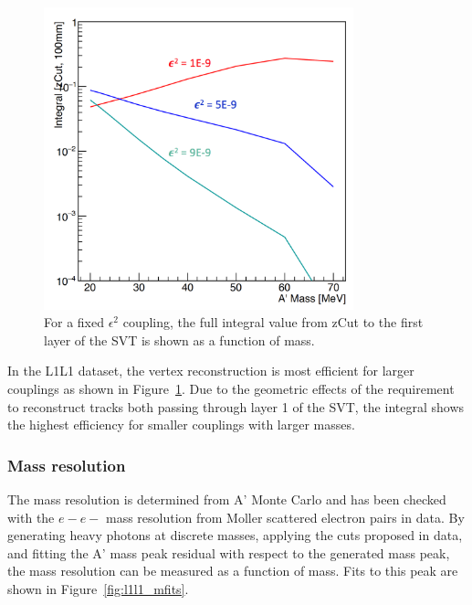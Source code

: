 \documentclass[twoside]{article}
\begin{document}
\begin{figure}[H]
  \centering
     \includegraphics[width=0.8\textwidth]{plots/L1L1_eff1d.png}
  \caption{For a fixed $\epsilon^2$ coupling, the full integral value from zCut to the first layer of the SVT is shown as a function of mass. }
  \label{fig:integratedVal1D}
\end{figure} 

In the L1L1 dataset, the vertex reconstruction is most efficient for larger couplings as shown in Figure~\ref{fig:integratedVal1D}. Due to the geometric effects of the requirement to reconstruct tracks both passing through layer 1 of the SVT, the integral shows the highest efficiency for smaller couplings with larger masses.

\subsubsection{Mass resolution}

The mass resolution is determined from A' Monte Carlo and has been checked with the $e-e-$ mass resolution from Moller scattered electron pairs in data. By generating heavy photons at discrete masses, applying the cuts proposed in data, and fitting the A' mass peak residual with respect to the generated mass peak, the mass resolution can be measured as a function of mass. Fits to this peak are shown in Figure~\ref{fig:l1l1_mfits}.
\end{document}
